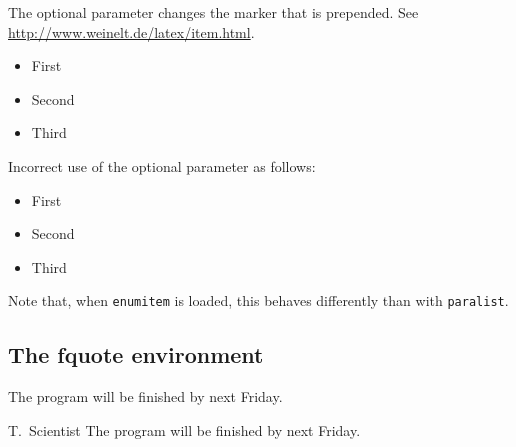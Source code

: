 \documentclass[../thesis-example-en]{subfiles}
\begin{document}
The optional parameter changes the marker that is prepended.
See \url{http://www.weinelt.de/latex/item.html}.
\begin{itemize}
  \item[A] First
  \item[B] Second
  \item[C] Third
\end{itemize}

Incorrect use of the optional parameter as follows:
\begin{itemize}
  \item[first] First
  \item[second] Second
  \item[third] Third
\end{itemize}
Note that, when \texttt{enumitem} is loaded, this behaves differently than with \texttt{paralist}.

\subsection{The fquote environment}

\begin{fquote}[T.\ Scientist]
  The program will be finished by next Friday.
\end{fquote}

\begin{gfquote}{T.\ Scientist}
  The program will be finished by next Friday.
\end{gfquote}
\end{document}
